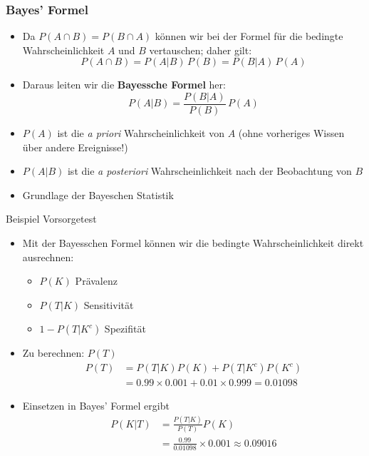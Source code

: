 \begin{frame}
    \frametitle{Bayes' Formel}

    \begin{itemize}
        \item Da $P(A\cap B) = P(B \cap A)$ können wir bei der Formel für die bedingte Wahrscheinlichkeit $A$ und $B$ vertauschen; daher gilt:
        $$
        P(A\cap B) = P(A|B)\,P(B) = P(B|A)\,P(A)
        $$  
        \item Daraus leiten wir die {\bf Bayessche Formel} her:
        $$
        P(A|B) = \frac{P(B|A)}{P(B)}\,P(A)
        $$
        \item $P(A)$ ist die {\em a priori} Wahrscheinlichkeit von $A$ (ohne vorheriges Wissen über andere Ereignisse!)
        \item $P(A|B)$ ist die {\em a posteriori} Wahrscheinlichkeit nach der Beobachtung von $B$
        \item Grundlage der Bayeschen Statistik
    \end{itemize}
\end{frame}


\begin{frame}{Beispiel Vorsorgetest}
  \begin{itemize}
  \item Mit der Bayesschen Formel können wir die bedingte
    Wahrscheinlichkeit direkt ausrechnen:
    \begin{itemize}
    \item $P(K)$ Prävalenz
    \item $P(T|K)$ Sensitivität
    \item $1-P(T|K^c)$ Spezifität
    \end{itemize}
  \item Zu berechnen: $P(T)$
    \begin{align*}
      P(T) &= P(T|K)P(K) + P(T|K^c)P(K^c) \\
      &= 0.99\times0.001 + 0.01\times 0.999 = 0.01098
    \end{align*}
  \item Einsetzen in Bayes' Formel ergibt
    \begin{align*}
      P(K|T) &= \frac{P(T|K)}{P(T)}P(K)\\
             &= \frac{0.99}{0.01098} \times  0.001 \approx 0.09016
    \end{align*}
  \end{itemize}
\end{frame}

